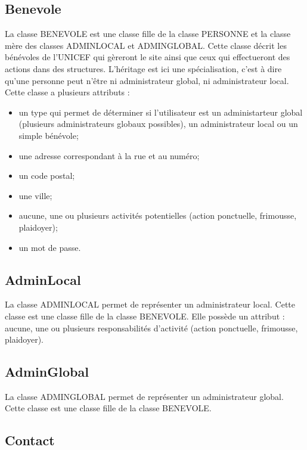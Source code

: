 \documentclass[asi, sansVersion]{picInsa}
\begin{document}
\subsection*{Benevole}

La classe BENEVOLE est une classe fille de la classe PERSONNE et la classe mère des classes ADMINLOCAL et ADMINGLOBAL. Cette classe décrit les bénévoles de l'UNICEF qui gèreront le site ainsi que ceux qui effectueront des actions dans des structures. L'héritage est ici une spécialisation, c'est à dire qu'une personne peut n'être ni administrateur global, ni administrateur local. \\
Cette classe a plusieurs attributs : 
\begin{itemize} 
\item un type qui permet de déterminer si l'utilisateur est un administarteur global (plusieurs administrateurs globaux possibles), un administrateur local ou un simple bénévole;
\item une adresse correspondant à la rue et au numéro;
\item un code postal;
\item une ville;
\item aucune, une ou plusieurs activités potentielles (action ponctuelle, frimousse, plaidoyer); %
\item un mot de passe. 
\end{itemize}

\subsection*{AdminLocal}

La classe ADMINLOCAL permet de représenter un administrateur local. Cette classe est une classe fille de la classe BENEVOLE. Elle possède un attribut : aucune, une ou plusieurs responsabilités d'activité (action ponctuelle, frimousse, plaidoyer). 

\subsection*{AdminGlobal}

La classe ADMINGLOBAL permet de représenter un administrateur global. Cette classe est une classe fille de la classe BENEVOLE. 

\subsection*{Contact}
\end{document}
